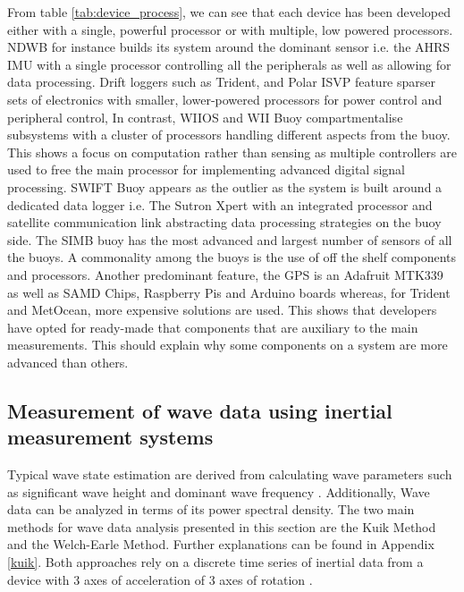 From table \ref{tab:device_process}, we can see that each device has been developed either with a single, powerful processor or with multiple, low powered processors. NDWB for instance builds its system around the dominant sensor i.e. the AHRS IMU with a single processor controlling all the peripherals as well as allowing for data processing. Drift loggers such as Trident, and Polar ISVP feature sparser sets of electronics with smaller, lower-powered processors for power control and peripheral control, In contrast, WIIOS and WII Buoy compartmentalise subsystems with a cluster of processors handling different aspects from the buoy. This shows a focus on computation rather than sensing as multiple controllers are used to free the main processor for implementing advanced digital signal processing. SWIFT Buoy appears as the outlier as the system is built around a dedicated data logger i.e. The Sutron Xpert with an integrated processor and satellite communication link abstracting data processing strategies on the buoy side. The SIMB buoy has the most advanced and largest number of sensors of all the buoys. A commonality among the buoys is the use of off the shelf components and processors. Another predominant feature, the GPS is an Adafruit MTK339 as well as SAMD Chips, Raspberry Pis and Arduino boards whereas, for Trident and MetOcean, more expensive solutions are used. This shows that developers have opted for ready-made that components that are auxiliary to the main measurements. This should explain why some components on a system are more advanced than others.



\subsection{Measurement of wave data using inertial measurement systems}

Typical wave state estimation are derived from calculating wave parameters such as significant wave height and dominant wave frequency \cite{williams2013wave}. Additionally, Wave data can be analyzed in terms of its power spectral density. The two main methods for wave data analysis presented in this section are the Kuik Method and the Welch-Earle Method. Further explanations can be found in Appendix \ref{kuik}. Both approaches rely on a discrete time series of inertial data from a device with 3 axes of acceleration of 3 axes of rotation \cite{kuik1988method,earle1996nondirectional}.

